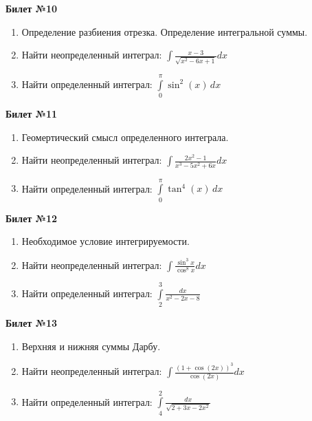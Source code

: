 \documentclass[a4paper, 12pt]{article}
\begin{document}
\begin{center}
	\textbf{Билет №10}
\end{center}
\begin{enumerate}
	\item Определение разбиения отрезка. Определение интегральной суммы.
	\item Найти неопределенный интеграл: $\displaystyle \int{\frac{x - 3}{\sqrt{x^2 - 6x + 1}} dx}$
	\item Найти определенный интеграл: $\displaystyle \int\limits_{0}^{\pi} \sin^2(x)\,dx$
\end{enumerate}

\begin{center}
	\textbf{Билет №11}
\end{center}
\begin{enumerate}
	\item Геомертический смысл определенного интеграла.
	\item Найти неопределенный интеграл: $\displaystyle \int{\frac{2x^2 - 1}{x^3 - 5x^2 +6x} dx}$
	\item Найти определенный интеграл: $\displaystyle \int\limits_{0}^{\pi} \tan^4(x)\,dx$
\end{enumerate}

\begin{center}
	\textbf{Билет №12}
\end{center}
\begin{enumerate}
	\item Необходимое условие интегрируемости.
	\item Найти неопределенный интеграл: $\displaystyle \int{\frac{\sin^3 x}{\cos^8 x} dx}$
	\item Найти определенный интеграл: $\displaystyle \int\limits_{2}^{3} \frac{dx}{x^2 - 2x - 8}$
\end{enumerate}

\begin{center}
	\textbf{Билет №13}
\end{center}
\begin{enumerate}
	\item Верхняя и нижняя суммы Дарбу.
	\item Найти неопределенный интеграл: $\displaystyle \int{\frac{(1 + \cos(2x))^3}{\cos(2x)}dx}$
	\item Найти определенный интеграл: $\displaystyle \int\limits_{4}^{2} \frac{dx}{\sqrt{2 + 3x - 2x^2}}$
\end{enumerate}
\end{document}
